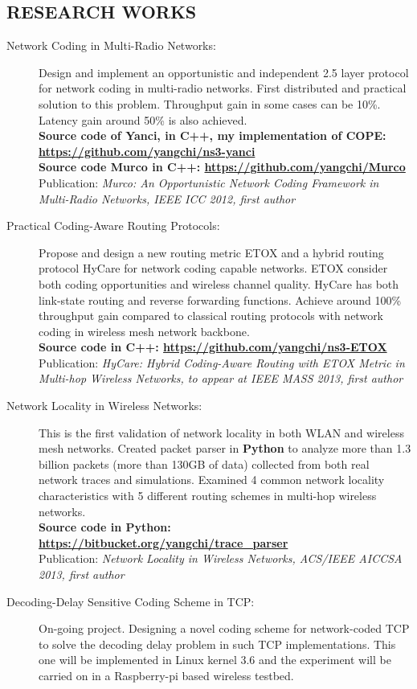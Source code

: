 \documentclass[line]{res}
\begin{document}
\begin{resume}
	\section{RESEARCH WORKS}
	\begin{description}
		\item[Network Coding in Multi-Radio Networks:] 
			Design and implement an opportunistic and independent 2.5 layer protocol for network coding in multi-radio networks. First distributed and practical solution to this problem. Throughput gain in some cases can be 10\%. Latency gain around 50\% is also achieved. \\
			\textbf{Source code of Yanci, in C++, my implementation of COPE: \url{https://github.com/yangchi/ns3-yanci}} \\
			\textbf{Source code Murco in C++: \url{https://github.com/yangchi/Murco}} \\
			Publication: \emph{Murco: An Opportunistic Network Coding Framework in Multi-Radio Networks, IEEE ICC 2012, first author}
		\item[Practical Coding-Aware Routing Protocols:] 
			Propose and design a new routing metric ETOX and a hybrid routing protocol HyCare for network coding capable networks. ETOX consider both coding opportunities and wireless channel quality. HyCare has both link-state routing and reverse forwarding functions. Achieve around 100\% throughput gain compared to classical routing protocols with network coding in wireless mesh network backbone.\\
			\textbf{Source code in C++: \url{https://github.com/yangchi/ns3-ETOX} } \\
			Publication: \emph{HyCare: Hybrid Coding-Aware Routing with ETOX Metric in Multi-hop Wireless Networks, to appear at IEEE MASS 2013, first author}
		\item[Network Locality in Wireless Networks:] 
			This is the first validation of network locality in both WLAN and wireless mesh networks. Created packet parser in \textbf{Python} to analyze more than 1.3 billion packets (more than 130GB of data) collected from both real network traces and simulations. Examined 4 common network locality characteristics with 5 different routing schemes in multi-hop wireless networks.\\
			\textbf{Source code in Python: \url{https://bitbucket.org/yangchi/trace_parser} } \\
			Publication: \emph{Network Locality in Wireless Networks, ACS/IEEE AICCSA 2013, first author}
		\item [Decoding-Delay Sensitive Coding Scheme in TCP:]
			On-going project. Designing a novel coding scheme for network-coded TCP to solve the decoding delay problem in such TCP implementations. This one will be implemented in Linux kernel 3.6 and the experiment will be carried on in a Raspberry-pi based wireless testbed.
	\end{description}
	

\end{resume}
\end{document}
